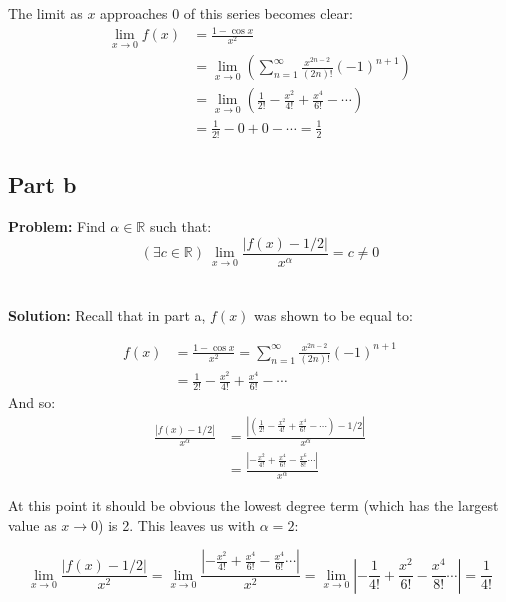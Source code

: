 \documentclass{article}
\begin{document}
The limit as $x$ approaches 0 of this series becomes clear:
\begin{align*}
\lim_{x\to 0}f(x)&=\frac{1-\cos x}{x^2}\\
&=\lim_{x\to 0}\left(\sum_{n=1}^\infty\frac{x^{2n-2}}{(2n)!}(-1)^{n+1}\right)\\
&=\lim_{x\to 0}\left(\frac{1}{2!}-\frac{x^2}{4!}+\frac{x^4}{6!}-\cdots\right)\\
&=\frac{1}{2!}-0+0-\cdots=\frac{1}{2}
\end{align*}

\subsection*{Part b}
\textbf{Problem:} Find $\alpha\in\mathbb R$ such that:
$$(\exists c\in\mathbb R)\ \lim_{x\to0}\frac{|f(x)-1/2|}{x^\alpha}=c\not=0$$
\\\\
\textbf{Solution:} Recall that in part a, $f(x)$ was shown to be equal to:

\begin{align*}
  f(x)&=\frac{1-\cos x}{x^2}=\sum_{n=1}^\infty \frac{x^{2n-2}}{(2n)!}(-1)^{n+1}\\
  &=\frac{1}{2!}-\frac{x^2}{4!}+\frac{x^4}{6!}-\cdots
\end{align*}
And so:
\begin{align*}
  \frac{|f(x)-1/2|}{x^\alpha}&=\frac{\left|\left(\frac{1}{2!}-\frac{x^2}{4!}+\frac{x^4}{6!}-\cdots\right)-1/2\right|}{x^\alpha}\\
  &=\frac{\left|-\frac{x^2}{4!}+\frac{x^4}{6!}-\frac{x^6}{8!}\cdots\right|}{x^\alpha}
\end{align*}

At this point it should be obvious the lowest degree term (which has the largest value as $x\to 0$) is 2. This leaves us with $\alpha=2$:

$$\lim_{x\to0}\frac{|f(x)-1/2|}{x^2}=\lim_{x\to0}\frac{\left|-\frac{x^2}{4!}+\frac{x^4}{6!}-\frac{x^4}{6!}\cdots\right|}{x^2}=\lim_{x\to0}\left|-\frac{1}{4!}+\frac{x^2}{6!}-\frac{x^4}{8!}\cdots\right|=\frac{1}{4!}$$
\end{document}
